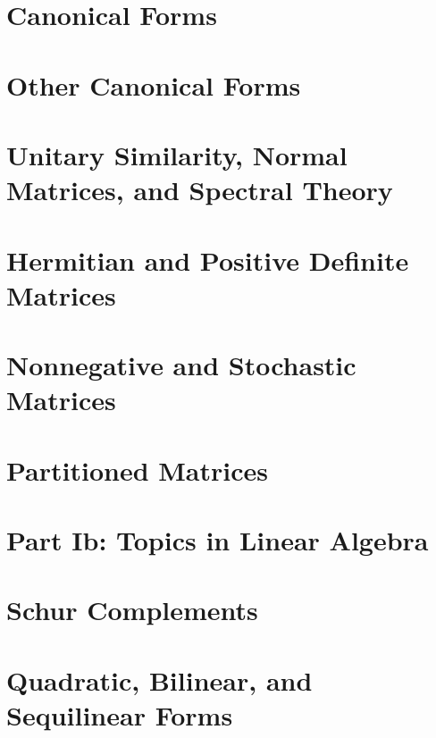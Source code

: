 \documentclass[a4paper]{article}
\begin{document}
\section{Canonical Forms}

\section{Other Canonical Forms}

\section{Unitary Similarity, Normal Matrices, and Spectral Theory}

\section{Hermitian and Positive Definite Matrices}

\section{Nonnegative and Stochastic Matrices}

\section{Partitioned Matrices}

\section*{Part Ib: Topics in Linear Algebra}

\section{Schur Complements}

\section{Quadratic, Bilinear, and Sequilinear Forms}
\end{document}
